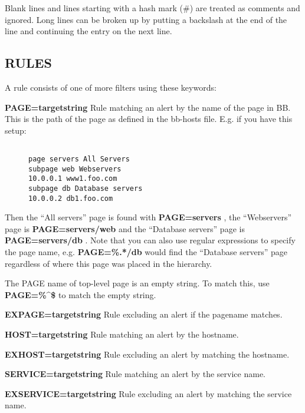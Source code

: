   Blank lines and lines starting with a hash mark (\#) are treated as comments and ignored. Long lines can be broken up by putting a backslash at the end of the line and continuing the entry on the next line. 


 
\subsection{RULES}
 A rule consists of one of more filters using these keywords: 

 \textbf{PAGE=targetstring}
 Rule matching an alert by the name of the page in BB. This is the path of the page as defined in the bb-hosts file. E.g. if you have this setup: \begin{description}
\item[]\begin{verbatim}

page servers All Servers
subpage web Webservers
10.0.0.1 www1.foo.com
subpage db Database servers
10.0.0.2 db1.foo.com

\end{verbatim}


\end{description}



  Then the ``All servers'' page is found with \textbf{PAGE=servers}
, the ``Webservers'' page is \textbf{PAGE=servers/web}
 and the ``Database servers'' page is \textbf{PAGE=servers/db}
. Note that you can also use regular expressions to specify the page name, e.g. \textbf{PAGE=\%.*/db}
 would find the ``Database servers'' page regardless of where this page was placed in the hierarchy. 


  The PAGE name of top-level page is an empty string. To match this, use \textbf{PAGE=\%\^{}\$}
 to match the empty string. 


 


 \textbf{EXPAGE=targetstring}
 Rule excluding an alert if the pagename matches. 


 \textbf{HOST=targetstring}
 Rule matching an alert by the hostname. 


 \textbf{EXHOST=targetstring}
 Rule excluding an alert by matching the hostname. 


 \textbf{SERVICE=targetstring}
 Rule matching an alert by the service name. 


 \textbf{EXSERVICE=targetstring}
 Rule excluding an alert by matching the service name. 


